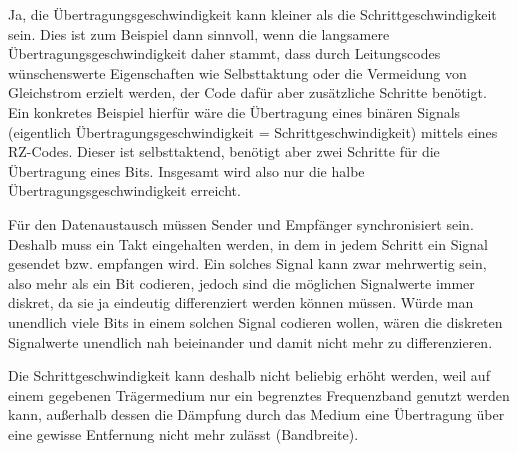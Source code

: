 \documentclass{../exercisesheet}
\begin{document}
\begin{exercise}{5}
	\begin{subexercise}
	
	\end{subexercise}

	\begin{subexercise}
	
	\end{subexercise}

	\begin{subexercise} 
	
	\end{subexercise}
\end{exercise}

\begin{exercise}{1.5}
	\begin{subexercise}
	Ja, die Übertragungsgeschwindigkeit kann kleiner als die Schrittgeschwindigkeit sein. Dies ist zum Beispiel dann sinnvoll, wenn die langsamere Übertragungsgeschwindigkeit daher stammt, dass durch Leitungscodes wünschenswerte Eigenschaften wie Selbsttaktung oder die Vermeidung von Gleichstrom erzielt werden, der Code dafür aber zusätzliche Schritte benötigt. Ein konkretes Beispiel hierfür wäre die Übertragung eines binären Signals (eigentlich Übertragungsgeschwindigkeit = Schrittgeschwindigkeit) mittels eines RZ-Codes. Dieser ist selbsttaktend, benötigt aber zwei Schritte für die Übertragung eines Bits. Insgesamt wird also nur die halbe Übertragungsgeschwindigkeit erreicht.
	\end{subexercise}

	\begin{subexercise}
	Für den Datenaustausch müssen Sender und Empfänger synchronisiert sein. Deshalb muss ein Takt eingehalten werden, in dem in jedem Schritt ein Signal gesendet bzw. empfangen wird. Ein solches Signal kann zwar mehrwertig sein, also mehr als ein Bit codieren, jedoch sind die möglichen Signalwerte immer diskret, da sie ja eindeutig differenziert werden können müssen. Würde man unendlich viele Bits in einem solchen Signal codieren wollen, wären die diskreten Signalwerte unendlich nah beieinander und damit nicht mehr zu differenzieren.
	\end{subexercise}

	\begin{subexercise} 
	Die Schrittgeschwindigkeit kann deshalb nicht beliebig erhöht werden, weil auf einem gegebenen Trägermedium nur ein begrenztes Frequenzband genutzt werden kann, außerhalb dessen die Dämpfung durch das Medium eine Übertragung über eine gewisse Entfernung nicht mehr zulässt (Bandbreite). 
	\end{subexercise}
\end{exercise}
\end{document}
